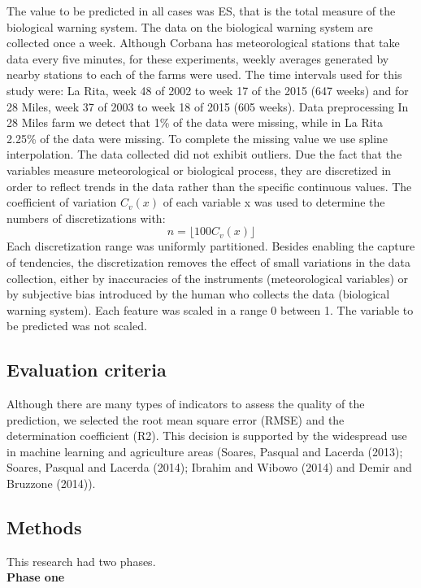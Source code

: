 \documentclass[review]{elsarticle}
\begin{document}
The value to be predicted in all cases was ES, that is the total measure of the biological warning system.
The data on the biological warning system are collected once a week. Although Corbana has meteorological stations that take data every five minutes, for these experiments, weekly averages generated by nearby stations to each of the farms were used.
The time intervals used for this study were: La Rita, week 48 of 2002 to week 17 of the 2015 (647 weeks) and for 28 Miles, week 37 of 2003 to week 18 of 2015 (605 weeks).
Data preprocessing
In 28 Miles farm we detect that 1\% of the data were missing, while in La Rita 2.25\% of the data were missing. To complete the missing value we use spline interpolation. The data collected did not exhibit outliers.
Due the fact that the variables measure meteorological or biological process, they are discretized in order to reflect trends in the data rather than the specific continuous values. The coefficient of variation $C_v (x)$ of each variable x was used to determine the numbers of discretizations with:
$$n= ⌊100 C_v (x)⌋$$
Each discretization range was uniformly partitioned. Besides enabling the capture of tendencies, the discretization removes the effect of small variations in the data collection, either by inaccuracies of the instruments (meteorological variables) or by subjective bias introduced by the human who collects the data (biological warning system).
Each feature was scaled in a range 0 between 1. The variable to be predicted was not scaled.

\subsection{Evaluation criteria}

Although there are many types of indicators to assess the quality of the prediction, we selected the root mean square error (RMSE) and the determination coefficient (R2).  This decision is supported by the widespread use in machine learning and agriculture areas (Soares, Pasqual and Lacerda (2013); Soares, Pasqual and Lacerda (2014); Ibrahim and Wibowo (2014) and Demir and Bruzzone (2014)).  

\subsection{Methods}
This research had two phases.\\
{\bf Phase one } \\
\end{document}

